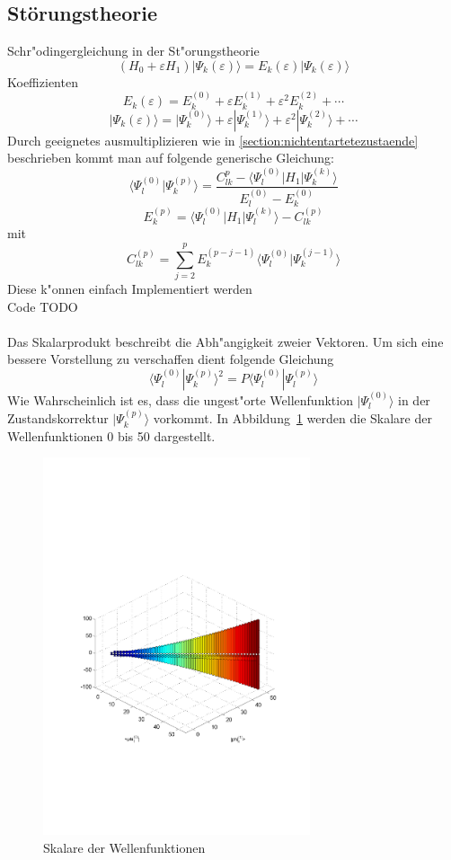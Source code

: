 \begin{refsection}
\subsection{Störungstheorie}
Schr"odingergleichung in der St"orungstheorie
\[
(H_0+\varepsilon H_1)|\Psi_k(\varepsilon)\rangle
=
E_k(\varepsilon)|\Psi_k(\varepsilon)\rangle
\]
Koeffizienten
\[
E_k(\varepsilon)
=
E_k^{(0)}+\varepsilon E_k^{(1)}+\varepsilon^2 E_k^{(2)}+\dotsb
\]
\[
|\Psi_k(\varepsilon)\rangle
=
|\Psi_k^{(0)}\rangle+\varepsilon|\Psi_k^{(1)}\rangle+
\varepsilon^2|\Psi_k^{(2)}\rangle+\dotsb
\]
Durch geeignetes ausmultiplizieren wie in \ref{section:nichtentartetezustaende}  beschrieben kommt man auf folgende generische Gleichung:
\[
\langle\Psi_l^{(0)}|\Psi_k^{(p)}\rangle
=
\frac{C_{lk}^{p}-\langle\Psi_l^{(0)}|H_1|\Psi_k^{(k)}\rangle}
{E_l^{(0)}-E_k^{(0)}}
\]
\[
E_k^{(p)}
=
\langle\Psi_l^{(0)}|H_1|\Psi_l^{(k)}\rangle-C_{lk}^{(p)}
\]
mit
\[
C_{lk}^{(p)}
=
\displaystyle\sum_{j=2}^{p} E_k^{(p-j-1)}
\langle\Psi_l^{(0)}|\Psi_k^{(j-1)}\rangle
\]
Diese k"onnen einfach Implementiert werden\\
Code TODO\\
\\
Das Skalarprodukt beschreibt die Abh"angigkeit zweier Vektoren. Um sich eine bessere Vorstellung zu verschaffen dient folgende Gleichung
\[
\langle\Psi_l^{(0)}|\Psi_k^{(p)}\rangle^2
=
P\langle\Psi_l^{(0)}|\Psi_l^{(p)}\rangle
\]
Wie Wahrscheinlich ist es, dass die ungest"orte Wellenfunktion $|\Psi_l^{(0)}\rangle$ in der Zustandskorrektur $|\Psi_k^{(p)}\rangle$ vorkommt. In Abbildung~\ref{skript:PLK12} werden die Skalare der Wellenfunktionen 0 bis 50 dargestellt.

\begin{figure}[h]	%
\centering
\includegraphics[width=0.7\textwidth]{anharmonisch/images/PLK12.pdf}
\caption{Skalare der Wellenfunktionen
\label{skript:PLK12}}
\end{figure}


\end{refsection}
